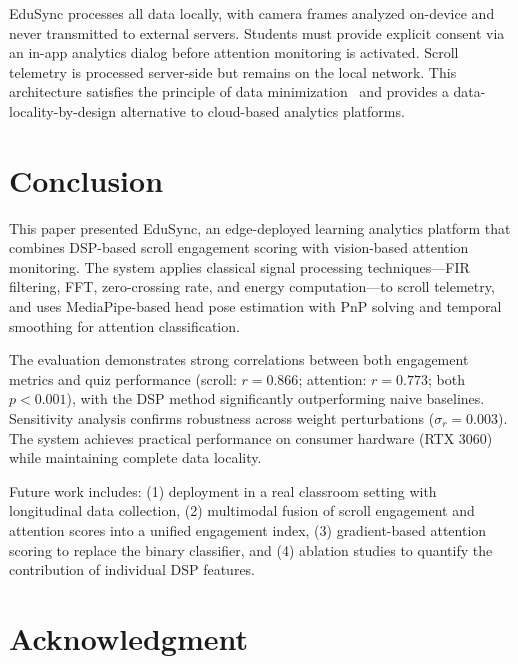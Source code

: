 \documentclass[conference]{IEEEtran}
\begin{document}
EduSync processes all data locally, with camera frames analyzed on-device and never transmitted to external servers. Students must provide explicit consent via an in-app analytics dialog before attention monitoring is activated. Scroll telemetry is processed server-side but remains on the local network. This architecture satisfies the principle of data minimization~\cite{gdpr2016} and provides a data-locality-by-design alternative to cloud-based analytics platforms.

\section{Conclusion}
\label{sec:conclusion}

This paper presented EduSync, an edge-deployed learning analytics platform that combines DSP-based scroll engagement scoring with vision-based attention monitoring. The system applies classical signal processing techniques---FIR filtering, FFT, zero-crossing rate, and energy computation---to scroll telemetry, and uses MediaPipe-based head pose estimation with PnP solving and temporal smoothing for attention classification.

The evaluation demonstrates strong correlations between both engagement metrics and quiz performance (scroll: $r = 0.866$; attention: $r = 0.773$; both $p < 0.001$), with the DSP method significantly outperforming naive baselines. Sensitivity analysis confirms robustness across weight perturbations ($\sigma_r = 0.003$). The system achieves practical performance on consumer hardware (RTX 3060) while maintaining complete data locality.

Future work includes: (1) deployment in a real classroom setting with longitudinal data collection, (2) multimodal fusion of scroll engagement and attention scores into a unified engagement index, (3) gradient-based attention scoring to replace the binary classifier, and (4) ablation studies to quantify the contribution of individual DSP features.

\section*{Acknowledgment}
\end{document}

